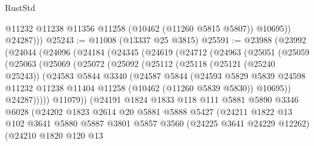 \begin{lexlean}{RustStd}
\begin{coremodule}
              @11232
              @11238
              @11356
              @11258
              (@10462 (@11260 @5815 @5807))
              @10695))
          @24287)))
@25243 := @11008 (@13337 @25 @3815)
@25591 := @23988
    (@23992
      (@24044
        (@24096
          (@24184
            (@24345
              (@24619
                (@24712
                  (@24963
                    (@25051
                      (@25059
                        (@25063
                          (@25069
                            (@25072
                              (@25092
                                (@25112
                                  (@25118
                                    (@25121 (@25240 @25243))
                                    (@24583
                                      @5844
                                      @3340
                                      (@24587
                                        @5844
                                        (@24593
                                          @5829
                                          @5839
                                          @24598
                                          @11232
                                          @11238
                                          @11404
                                          @11258
                                          (@10462 (@11260 @5839 @5830))
                                          @10695))
                                      @24287)))))
                            @11079))
                        (@24191
                          @1824
                          @1833
                          @118
                          @111
                          @5881
                          @5890
                          @3346
                          @6028
                          (@24202
                            @1823
                            @2614
                            @20
                            @5881
                            @5888
                            @5427
                            (@24211
                              @1822
                              @13
                              @102
                              @3641
                              @5880
                              @5887
                              @3801
                              @5857
                              @3560
                              (@24225 @3641 @24229 @12262)
                              (@24210
                                @1820
                                @120
                                @13

\end{coremodule}
\end{lexlean}
